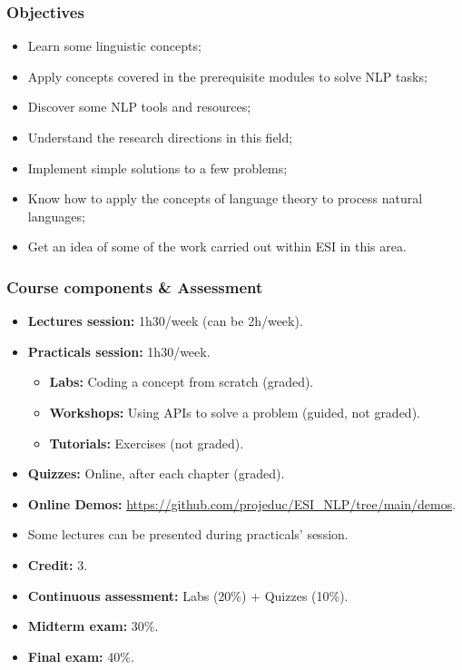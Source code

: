 \documentclass{beamer}
\begin{document}
\begin{frame}
\frametitle{Objectives}

\begin{itemize}
	\item Learn some linguistic concepts;
	\item Apply concepts covered in the prerequisite modules to solve NLP tasks;
	\item Discover some NLP tools and resources;
	\item Understand the research directions in this field;
	\item Implement simple solutions to a few problems;
	\item Know how to apply the concepts of language theory to process natural languages;
	\item Get an idea of some of the work carried out within ESI in this area.
\end{itemize}

\end{frame}


\begin{frame}
\frametitle{Course components \& Assessment}

\begin{itemize}
	\item \textbf{Lectures session:} 1h30/week (can be 2h/week).
	\item \textbf{Practicals session:} 1h30/week.
	\begin{itemize}
		\item \textbf{Labs:} Coding a concept from scratch (graded).
		\item \textbf{Workshops:} Using APIs to solve a problem (guided, not graded).
		\item \textbf{Tutorials:} Exercises (not graded).
	\end{itemize}
	\item \textbf{Quizzes:} Online, after each chapter (graded).
	\item \textbf{Online Demos:} {\scriptsize\url{https://github.com/projeduc/ESI_NLP/tree/main/demos}}.
	\item Some lectures can be presented during practicals' session.
\end{itemize}

\vfill

\begin{itemize}
	\item \textbf{Credit:} 3.
	\item \textbf{Continuous assessment:} Labs (20\%) + Quizzes (10\%).
	\item \textbf{Midterm exam:} 30\%.
	\item \textbf{Final exam:} 40\%.
\end{itemize}

\end{frame}
\end{document}

